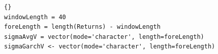 	

%	
%			
%			
%	

\pagebreak{}
\begin{lstlisting}[title={‘Código R: GARCH vs volatilidad promedio retorno},basicstyle=\ttfamily]{}
windowLength = 40
foreLength = length(Returns) - windowLength
sigmaAvgV = vector(mode='character', length=foreLength)
sigmaGarchV <- vector(mode='character', length=foreLength)
\end{lstlisting}
%	
%				
	
